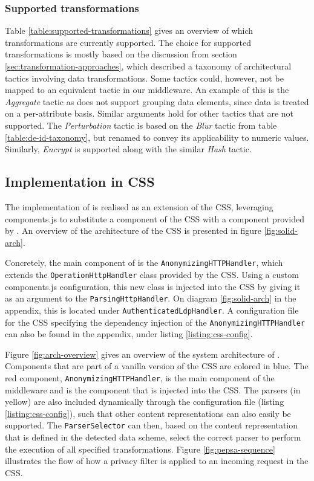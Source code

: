 

\subsubsection{Supported transformations}
Table \ref{table:supported-transformations} gives an overview of which transformations are currently supported. The choice for supported transformations is mostly based on the discussion from section \ref{sec:transformation-approaches}, which described a taxonomy of architectural tactics involving data transformations. Some tactics could, however, not be mapped to an equivalent tactic in our middleware. An example of this is the \textit{Aggregate} tactic as \middleware{} does not support grouping data elements, since data is treated on a per-attribute basis. Similar arguments hold for other tactics that are not supported. The \textit{Perturbation} tactic is based on the \textit{Blur} tactic from table \ref{table:de-id-taxonomy}, but renamed to convey its applicability to numeric values. Similarly, \textit{Encrypt} is supported along with the similar \textit{Hash} tactic.

\subsection{Implementation in CSS}
The implementation of \middleware{} is realised as an extension of the \acrlong{CSS}, leveraging components.js to substitute a component of the \gls{CSS} with a component provided by \middleware{}. An overview of the architecture of the \gls{CSS} is presented in figure \ref{fig:solid-arch}.

Concretely, the main component of \middleware{} is the \texttt{AnonymizingHTTPHandler}, which extends the \texttt{OperationHttpHandler} class provided by the \gls{CSS}. Using a custom components.js configuration, this new class is injected into the \gls{CSS} by giving it as an argument to the \texttt{ParsingHttpHandler}. On diagram \ref{fig:solid-arch} in the appendix, this is located under \texttt{AuthenticatedLdpHandler}. A configuration file for the \gls{CSS} specifying the dependency injection of the \texttt{AnonymizingHTTPHandler} can also be found in the appendix, under listing \ref{listing:css-config}.

Figure \ref{fig:arch-overview} gives an overview of the system architecture of \middleware{}. Components that are part of a vanilla version of the \gls{CSS} are colored in blue. The red component, \texttt{AnonymizingHTTPHandler}, is the main component of the middleware and is the component that is injected into the \gls{CSS}. The parsers (in yellow) are also included dynamically through the configuration file (listing \ref{listing:css-config}), such that other content representations can also easily be supported. The \texttt{ParserSelector} can then, based on the content representation that is defined in the detected data scheme, select the correct parser to perform the execution of all specified transformations. 
Figure \ref{fig:pepsa-sequence} illustrates the flow of how a privacy filter is applied to an incoming request in the \gls{CSS}.

